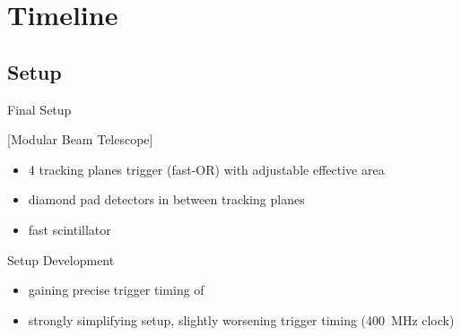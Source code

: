 \section{Timeline}
\subsection{Setup}
\begin{frame}{Final Setup}

	[Modular Beam Telescope]\vspace{-10pt}

	\begin{itemize}\itemfill
		\item 4 tracking planes \ra trigger (fast-OR) with adjustable effective area
		\item diamond pad detectors in between tracking planes
		\item fast scintillator 
	\end{itemize}

\end{frame}
\begin{frame}{Setup Development}

	
	\begin{itemize}\itemfill
		\item<2-> gaining precise trigger timing of 
		\item<3-> strongly simplifying setup, slightly worsening trigger timing (\SI{400}{\mega\hertz} clock)
	\end{itemize}
	
\end{frame}
